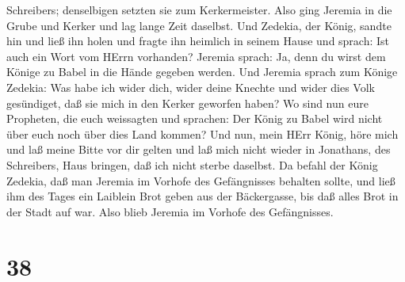 Schreibers; denselbigen setzten sie zum Kerkermeister. 
Also ging Jeremia in die Grube und Kerker und lag lange Zeit daselbst.
 Und Zedekia, der König, sandte hin und ließ ihn holen und
fragte ihn heimlich in seinem Hause und sprach: Ist auch ein Wort vom
HErrn vorhanden? Jeremia sprach: Ja, denn du wirst dem Könige zu Babel
in die Hände gegeben werden.  Und Jeremia sprach zum Könige
Zedekia: Was habe ich wider dich, wider deine Knechte und wider dies
Volk gesündiget, daß sie mich in den Kerker geworfen haben?
 Wo sind nun eure Propheten, die euch weissagten und
sprachen: Der König zu Babel wird nicht über euch noch über dies Land
kommen?  Und nun, mein HErr König, höre mich und laß meine
Bitte vor dir gelten und laß mich nicht wieder in Jonathans, des
Schreibers, Haus bringen, daß ich nicht sterbe daselbst. 
Da befahl der König Zedekia, daß man Jeremia im Vorhofe des Gefängnisses
behalten sollte, und ließ ihm des Tages ein Laiblein Brot geben aus der
Bäckergasse, bis daß alles Brot in der Stadt auf war. Also blieb Jeremia
im Vorhofe des Gefängnisses.

\hypertarget{section-37}{%
\section{38}\label{section-37}}


